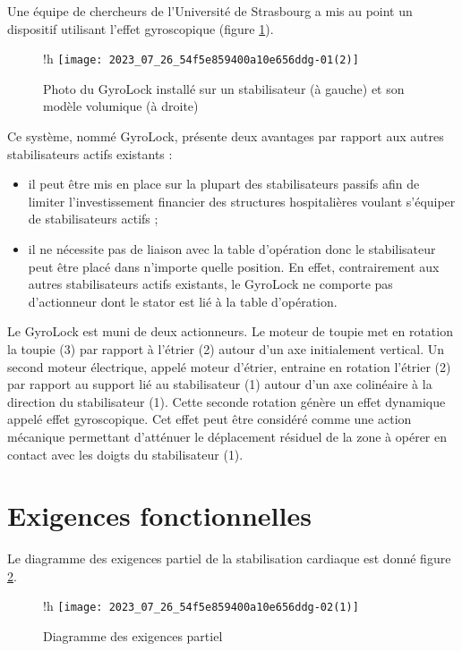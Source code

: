 Une équipe de chercheurs de l'Université de Strasbourg a mis au point un dispositif utilisant l'effet gyroscopique (figure \ref{fig:02}).

\begin{figure}{!h}
\centering
\texttt{[image: 2023\_07\_26\_54f5e859400a10e656ddg-01(2)]}
\caption{Photo du GyroLock installé sur un stabilisateur (à gauche) et son modèle volumique (à droite)\label{fig:02}}
\end{figure}


Ce système, nommé GyroLock, présente deux avantages par rapport aux autres stabilisateurs actifs existants :

\begin{itemize}
  \item il peut être mis en place sur la plupart des stabilisateurs passifs afin de limiter l'investissement financier des structures hospitalières voulant s'équiper de stabilisateurs actifs ;

  \item il ne nécessite pas de liaison avec la table d'opération donc le stabilisateur peut être placé dans n'importe quelle position. En effet, contrairement aux autres stabilisateurs actifs existants, le GyroLock ne comporte pas d'actionneur dont le stator est lié à la table d'opération.

\end{itemize}

Le GyroLock est muni de deux actionneurs. Le moteur de toupie met en rotation la toupie (3) par rapport à l'étrier (2) autour d'un axe initialement vertical. Un second moteur électrique, appelé moteur d'étrier, entraine en rotation l'étrier (2) par rapport au support lié au stabilisateur (1) autour d'un axe colinéaire à la direction du stabilisateur (1). Cette seconde rotation génère un effet dynamique appelé effet gyroscopique. Cet effet peut être considéré comme une action mécanique permettant d'atténuer le déplacement résiduel de la zone à opérer en contact avec les doigts du stabilisateur (1).

\section{Exigences fonctionnelles}
Le diagramme des exigences partiel de la stabilisation cardiaque est donné figure \ref{fig:03}.


\begin{figure}{!h}
\centering
\texttt{[image: 2023\_07\_26\_54f5e859400a10e656ddg-02(1)]}
\caption{Diagramme des exigences partiel\label{fig:03}}
\end{figure}

